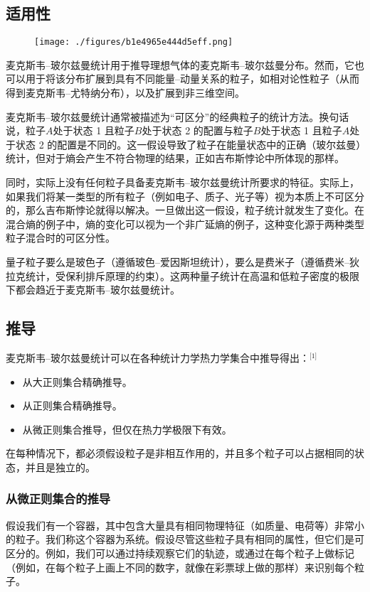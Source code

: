 \subsection{适用性}
\begin{figure}[ht]
\centering
\texttt{[image: ./figures/b1e4965e444d5eff.png]}
\caption{} \label{fig_MBTJ_2}
\end{figure}
麦克斯韦–玻尔兹曼统计用于推导理想气体的麦克斯韦–玻尔兹曼分布。然而，它也可以用于将该分布扩展到具有不同能量–动量关系的粒子，如相对论性粒子（从而得到麦克斯韦–尤特纳分布），以及扩展到非三维空间。

麦克斯韦–玻尔兹曼统计通常被描述为“可区分”的经典粒子的统计方法。换句话说，粒子\(A\)处于状态 1 且粒子\(B\)处于状态 2 的配置与粒子\(B\)处于状态 1 且粒子\(A\)处于状态 2 的配置是不同的。这一假设导致了粒子在能量状态中的正确（玻尔兹曼）统计，但对于熵会产生不符合物理的结果，正如吉布斯悖论中所体现的那样。

同时，实际上没有任何粒子具备麦克斯韦–玻尔兹曼统计所要求的特征。实际上，如果我们将某一类型的所有粒子（例如电子、质子、光子等）视为本质上不可区分的，那么吉布斯悖论就得以解决。一旦做出这一假设，粒子统计就发生了变化。在混合熵的例子中，熵的变化可以视为一个非广延熵的例子，这种变化源于两种类型粒子混合时的可区分性。

量子粒子要么是玻色子（遵循玻色–爱因斯坦统计），要么是费米子（遵循费米–狄拉克统计，受保利排斥原理的约束）。这两种量子统计在高温和低粒子密度的极限下都会趋近于麦克斯韦–玻尔兹曼统计。
\subsection{推导}  
麦克斯韦–玻尔兹曼统计可以在各种统计力学热力学集合中推导得出：\(^\text{[1]}\)
\begin{itemize}
\item 从大正则集合精确推导。
\item 从正则集合精确推导。
\item 从微正则集合推导，但仅在热力学极限下有效。
\end{itemize}
在每种情况下，都必须假设粒子是非相互作用的，并且多个粒子可以占据相同的状态，并且是独立的。
\subsubsection{从微正则集合的推导}
假设我们有一个容器，其中包含大量具有相同物理特征（如质量、电荷等）非常小的粒子。我们称这个容器为系统。假设尽管这些粒子具有相同的属性，但它们是可区分的。例如，我们可以通过持续观察它们的轨迹，或通过在每个粒子上做标记（例如，在每个粒子上画上不同的数字，就像在彩票球上做的那样）来识别每个粒子。

